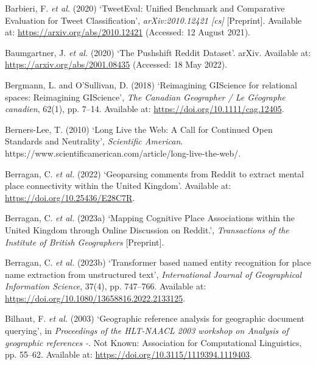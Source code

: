 \documentclass[
  letterpaper,
  11pt,
  english,
  onehalfspacing,
  headsepline]{MastersDoctoralThesis}
\newlength{\cslhangindent}
\newlength{\cslentryspacingunit} %
\newenvironment{CSLReferences}[2] %
 {%
  \setlength{\parindent}{0pt}
  \ifodd #1
  \let\oldpar\par
  \def\par{\hangindent=\cslhangindent\oldpar}
  \fi
  \setlength{\parskip}{#2\cslentryspacingunit}
 }%
 {}
\begin{document}
\begin{CSLReferences}{0}{0}
\leavevmode{}%
Barbieri, F. \emph{et al.} (2020) {`{TweetEval}: {Unified Benchmark} and
{Comparative Evaluation} for {Tweet Classification}'},
\emph{arXiv:2010.12421 {[}cs{]}} {[}Preprint{]}. Available at:
\url{https://arxiv.org/abs/2010.12421} (Accessed: 12 August 2021).

\leavevmode{}%
Baumgartner, J. \emph{et al.} (2020) {`The {Pushshift Reddit Dataset}'}.
{arXiv}. Available at: \url{https://arxiv.org/abs/2001.08435} (Accessed:
18 May 2022).

\leavevmode{}%
Bergmann, L. and O'Sullivan, D. (2018) {`Reimagining {GIScience} for
relational spaces: {Reimagining GIScience}'}, \emph{The Canadian
Geographer / Le G{é}ographe canadien}, 62(1), pp. 7--14. Available at:
\url{https://doi.org/10.1111/cag.12405}.

\leavevmode{}%
Berners-Lee, T. (2010) {`Long {Live} the {Web}: {A Call} for {Continued
Open Standards} and {Neutrality}'}, \emph{Scientific American}.
https://www.scientificamerican.com/article/long-live-the-web/.

\leavevmode{}%
Berragan, C. \emph{et al.} (2022) {`Geoparsing comments from {Reddit} to
extract mental place connectivity within the {United Kingdom}'}.
Available at: \url{https://doi.org/10.25436/E28C7R}.

\leavevmode{}%
Berragan, C. \emph{et al.} (2023a) {`Mapping {Cognitive Place
Associations} within the {United Kingdom} through {Online Discussion} on
{Reddit}.'}, \emph{Transactions of the Institute of British Geographers}
{[}Preprint{]}.

\leavevmode{}%
Berragan, C. \emph{et al.} (2023b) {`Transformer based named entity
recognition for place name extraction from unstructured text'},
\emph{International Journal of Geographical Information Science}, 37(4),
pp. 747--766. Available at:
\url{https://doi.org/10.1080/13658816.2022.2133125}.

\leavevmode{}%
Bilhaut, F. \emph{et al.} (2003) {`Geographic reference analysis for
geographic document querying'}, in \emph{Proceedings of the {HLT-NAACL}
2003 workshop on {Analysis} of geographic references -}. {Not Known}:
{Association for Computational Linguistics}, pp. 55--62. Available at:
\url{https://doi.org/10.3115/1119394.1119403}.


\end{CSLReferences}
\end{document}
